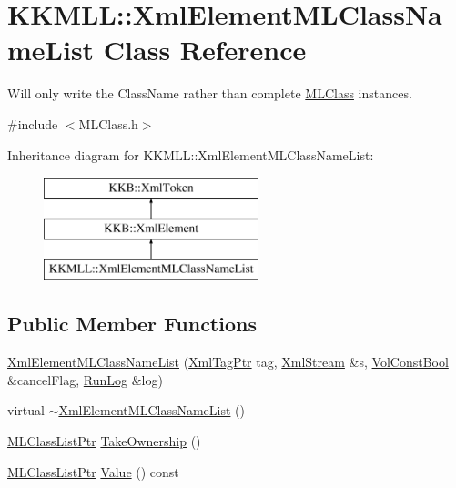 \hypertarget{class_k_k_m_l_l_1_1_xml_element_m_l_class_name_list}{}\section{K\+K\+M\+LL\+:\+:Xml\+Element\+M\+L\+Class\+Name\+List Class Reference}
\label{class_k_k_m_l_l_1_1_xml_element_m_l_class_name_list}


Will only write the Class\+Name rather than complete \hyperlink{class_k_k_m_l_l_1_1_m_l_class}{M\+L\+Class} instances.  




{\ttfamily \#include $<$M\+L\+Class.\+h$>$}

Inheritance diagram for K\+K\+M\+LL\+:\+:Xml\+Element\+M\+L\+Class\+Name\+List\+:\begin{figure}[H]
\begin{center}
\leavevmode
\includegraphics[height=3.000000cm]{class_k_k_m_l_l_1_1_xml_element_m_l_class_name_list}
\end{center}
\end{figure}
\subsection*{Public Member Functions}
\begin{DoxyCompactItemize}
\item 
\hyperlink{class_k_k_m_l_l_1_1_xml_element_m_l_class_name_list_a3b0128eb8c9596f004a252613fef0b27}{Xml\+Element\+M\+L\+Class\+Name\+List} (\hyperlink{namespace_k_k_b_a9253a3ea8a5da18ca82be4ca2b390ef0}{Xml\+Tag\+Ptr} tag, \hyperlink{class_k_k_b_1_1_xml_stream}{Xml\+Stream} \&s, \hyperlink{namespace_k_k_b_a7d390f568e2831fb76b86b56c87bf92f}{Vol\+Const\+Bool} \&cancel\+Flag, \hyperlink{class_k_k_b_1_1_run_log}{Run\+Log} \&log)
\item 
virtual \hyperlink{class_k_k_m_l_l_1_1_xml_element_m_l_class_name_list_a535835f14dc6d38558de0700cc358166}{$\sim$\+Xml\+Element\+M\+L\+Class\+Name\+List} ()
\item 
\hyperlink{namespace_k_k_m_l_l_af091cde3f4a4315658b41a5e7583fc26}{M\+L\+Class\+List\+Ptr} \hyperlink{class_k_k_m_l_l_1_1_xml_element_m_l_class_name_list_ae2f69705f49c3e4246363ff01fcba962}{Take\+Ownership} ()
\item 
\hyperlink{namespace_k_k_m_l_l_af091cde3f4a4315658b41a5e7583fc26}{M\+L\+Class\+List\+Ptr} \hyperlink{class_k_k_m_l_l_1_1_xml_element_m_l_class_name_list_a2a3211fc5d685e8733a0b88da814b254}{Value} () const 
\end{DoxyCompactItemize}
